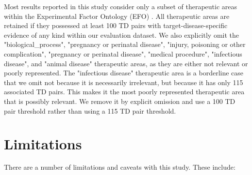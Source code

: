\documentclass{article}
\begin{document}
Most results reported in this study consider only a subset of therapeutic areas within the Experimental Factor Ontology (EFO) \cite{PMID:20200009}. All therapeutic areas are retained if they possessed at least 100 TD pairs with target-disease-specific evidence of any kind within our evaluation dataset. We also explicitly omit the "biological\_process", "pregnancy or perinatal disease", "injury, poisoning or other complication", "pregnancy or perinatal disease", "medical procedure", "infectious disease", and "animal disease" therapeutic areas, as they are either not relevant or poorly represented. The "infectious disease" therapeutic area is a borderline case that we omit not because it is necessarily irrelevant, but because it has only 115 associated TD pairs. This makes it the most poorly represented therapeutic area that is possibly relevant. We remove it by explicit omission and use a 100 TD pair threshold rather than using a 115 TD pair threshold.

\section{Limitations}
\label{sec:limitations}

There are a number of limitations and caveats with this study. These include:
\end{document}
